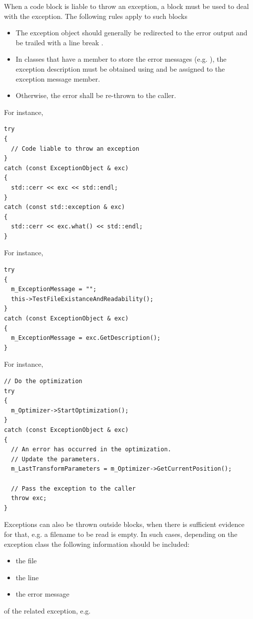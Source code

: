 When a code block is liable to throw an exception, a  block must
be used to deal with the exception. The following rules apply to such blocks
\begin{itemize}
\item The exception object should generally be redirected to the error output
 and be trailed with a line break .
\item In classes that have a member to store the error messages (e.g.
), the exception description must be obtained using
 and be assigned to the exception message member.
\item Otherwise, the error shall be re-thrown to the caller.
\end{itemize}

For instance,

\small
\begin{verbatim}
try
{
  // Code liable to throw an exception
}
catch (const ExceptionObject & exc)
{
  std::cerr << exc << std::endl;
}
catch (const std::exception & exc)
{
  std::cerr << exc.what() << std::endl;
}
\end{verbatim}
\normalsize

For instance,

\small
\begin{verbatim}
try
{
  m_ExceptionMessage = "";
  this->TestFileExistanceAndReadability();
}
catch (const ExceptionObject & exc)
{
  m_ExceptionMessage = exc.GetDescription();
}
\end{verbatim}
\normalsize

For instance,

\small
\begin{verbatim}
// Do the optimization
try
{
  m_Optimizer->StartOptimization();
}
catch (const ExceptionObject & exc)
{
  // An error has occurred in the optimization.
  // Update the parameters.
  m_LastTransformParameters = m_Optimizer->GetCurrentPosition();

  // Pass the exception to the caller
  throw exc;
}
\end{verbatim}
\normalsize

Exceptions can also be thrown outside  blocks, when there is
sufficient evidence for that, e.g. a filename to be read is empty. In such
cases, depending on the exception class the following information should be
included:
\begin{itemize}
\item the file
\item the line
\item the error message
\end{itemize}
of the related exception, e.g.

